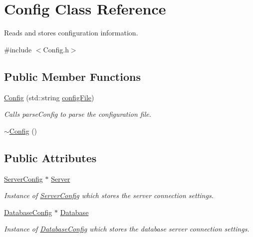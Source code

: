 \hypertarget{classConfig}{\section{Config Class Reference}
\label{classConfig}
}


Reads and stores configuration information.  




{\ttfamily \#include $<$Config.\-h$>$}

\subsection*{Public Member Functions}
\begin{DoxyCompactItemize}
\item 
\hyperlink{classConfig_ae67e338ea42e242cb5b374b6583c8b1c}{Config} (std\-::string \hyperlink{classConfig_a08b7b2c4eadf7dda51404f76fd6e0280}{config\-File})
\begin{DoxyCompactList}\small\item\em Calls parse\-Config to parse the configuration file. \end{DoxyCompactList}\item 
\hyperlink{classConfig_a543dce59b66475c5108088ee4ce1cdfc}{$\sim$\-Config} ()
\end{DoxyCompactItemize}
\subsection*{Public Attributes}
\begin{DoxyCompactItemize}
\item 
\hypertarget{classConfig_a249a19a298cdcfd4223609142e15e5de}{\hyperlink{structServerConfig}{Server\-Config} $\ast$ \hyperlink{classConfig_a249a19a298cdcfd4223609142e15e5de}{Server}}\label{classConfig_a249a19a298cdcfd4223609142e15e5de}

\begin{DoxyCompactList}\small\item\em Instance of \hyperlink{structServerConfig}{Server\-Config} which stores the server connection settings. \end{DoxyCompactList}\item 
\hypertarget{classConfig_a7c1bdf72973da53666514dbd549cc400}{\hyperlink{structDatabaseConfig}{Database\-Config} $\ast$ \hyperlink{classConfig_a7c1bdf72973da53666514dbd549cc400}{Database}}\label{classConfig_a7c1bdf72973da53666514dbd549cc400}

\begin{DoxyCompactList}\small\item\em Instance of \hyperlink{structDatabaseConfig}{Database\-Config} which stores the database server connection settings. \end{DoxyCompactList}\end{DoxyCompactItemize}
